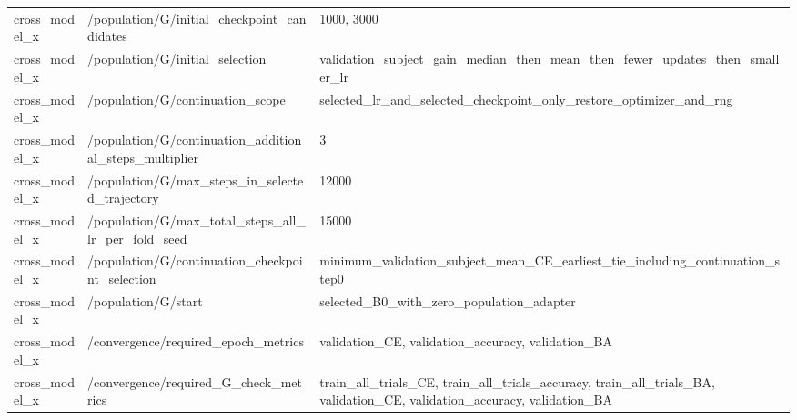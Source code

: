 \begin{longtable}{p{.65in}p{2.8in}p{3.2in}}
cross\_\allowbreak{}model\_\allowbreak{}x & /population/G/initial\_\allowbreak{}checkpoint\_\allowbreak{}candidates & 1000, 3000 \\
cross\_\allowbreak{}model\_\allowbreak{}x & /population/G/initial\_\allowbreak{}selection & validation\_\allowbreak{}subject\_\allowbreak{}gain\_\allowbreak{}median\_\allowbreak{}then\_\allowbreak{}mean\_\allowbreak{}then\_\allowbreak{}fewer\_\allowbreak{}updates\_\allowbreak{}then\_\allowbreak{}smaller\_\allowbreak{}lr \\
cross\_\allowbreak{}model\_\allowbreak{}x & /population/G/continuation\_\allowbreak{}scope & selected\_\allowbreak{}lr\_\allowbreak{}and\_\allowbreak{}selected\_\allowbreak{}checkpoint\_\allowbreak{}only\_\allowbreak{}restore\_\allowbreak{}optimizer\_\allowbreak{}and\_\allowbreak{}rng \\
cross\_\allowbreak{}model\_\allowbreak{}x & /population/G/continuation\_\allowbreak{}additional\_\allowbreak{}steps\_\allowbreak{}multiplier & 3 \\
cross\_\allowbreak{}model\_\allowbreak{}x & /population/G/max\_\allowbreak{}steps\_\allowbreak{}in\_\allowbreak{}selected\_\allowbreak{}trajectory & 12000 \\
cross\_\allowbreak{}model\_\allowbreak{}x & /population/G/max\_\allowbreak{}total\_\allowbreak{}steps\_\allowbreak{}all\_\allowbreak{}lr\_\allowbreak{}per\_\allowbreak{}fold\_\allowbreak{}seed & 15000 \\
cross\_\allowbreak{}model\_\allowbreak{}x & /population/G/continuation\_\allowbreak{}checkpoint\_\allowbreak{}selection & minimum\_\allowbreak{}validation\_\allowbreak{}subject\_\allowbreak{}mean\_\allowbreak{}CE\_\allowbreak{}earliest\_\allowbreak{}tie\_\allowbreak{}including\_\allowbreak{}continuation\_\allowbreak{}step0 \\
cross\_\allowbreak{}model\_\allowbreak{}x & /population/G/start & selected\_\allowbreak{}B0\_\allowbreak{}with\_\allowbreak{}zero\_\allowbreak{}population\_\allowbreak{}adapter \\
cross\_\allowbreak{}model\_\allowbreak{}x & /convergence/required\_\allowbreak{}epoch\_\allowbreak{}metrics & validation\_\allowbreak{}CE, validation\_\allowbreak{}accuracy, validation\_\allowbreak{}BA \\
cross\_\allowbreak{}model\_\allowbreak{}x & /convergence/required\_\allowbreak{}G\_\allowbreak{}check\_\allowbreak{}metrics & train\_\allowbreak{}all\_\allowbreak{}trials\_\allowbreak{}CE, train\_\allowbreak{}all\_\allowbreak{}trials\_\allowbreak{}accuracy, train\_\allowbreak{}all\_\allowbreak{}trials\_\allowbreak{}BA, validation\_\allowbreak{}CE, validation\_\allowbreak{}accuracy, validation\_\allowbreak{}BA \\

\end{longtable}
